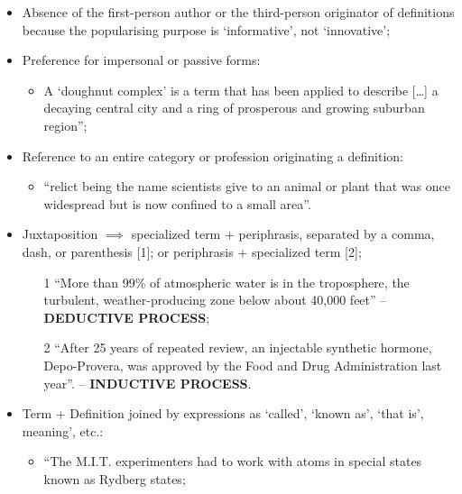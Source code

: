 \begin{itemize}

\item Absence of the first-person author or the third-person originator of definitions because the popularising purpose is ‘informative’, not ‘innovative’;

\item Preference for impersonal or passive forms:

\begin{itemize}
\item A ‘doughnut complex’ is a term that has been applied to describe […] a decaying central city and a ring of prosperous and growing suburban region”;
\end{itemize}

\item Reference to an entire category or profession originating a definition:

\begin{itemize}
\item “relict being the name scientists give to an animal or plant that was once widespread but is now confined to a small area”.
\end{itemize}

\item Juxtaposition $\implies$ specialized term + periphrasis, separated by a comma, dash, or parenthesis [1]; or periphrasis + specialized term [2]; 

\begin{itemize}

\item [1] “More than 99\% of atmospheric water is in the troposphere, the turbulent, weather-producing zone below about 40,000 feet” – \textbf{DEDUCTIVE PROCESS};
\item [2] “After 25 years of repeated review, an injectable synthetic hormone, Depo-Provera, was approved by the Food and Drug Administration last year”. – \textbf{INDUCTIVE PROCESS}.   

\end{itemize}

\item Term + Definition joined by expressions as ‘called’, ‘known as’, ‘that is’, meaning’, etc.:

\begin{itemize}
\item “The M.I.T. experimenters had to work with atoms in special states known as Rydberg states;
\end{itemize}


\end{itemize}

